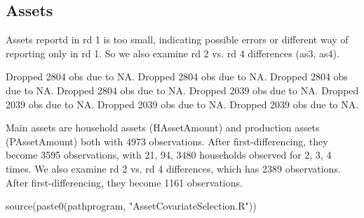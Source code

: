 \subsection{Assets}

Assets reportd in rd 1 is too small, indicating possible errors or different way of reporting only in rd 1. So we also examine rd 2 vs. rd 4 differences (\textsf{as3, as4}).


\begin{Schunk}
\begin{Soutput}
Dropped 2804 obs due to NA.
Dropped 2804 obs due to NA.
Dropped 2804 obs due to NA.
Dropped 2804 obs due to NA.
Dropped 2039 obs due to NA.
Dropped 2039 obs due to NA.
Dropped 2039 obs due to NA.
Dropped 2039 obs due to NA.
\end{Soutput}
\end{Schunk}

Main assets are household assets (\textsf{HAssetAmount}) and production assets (\textsf{PAssetAmount}) both with 4973 observations. After first-differencing, they become 3595 observations, with 21, 94, 3480 households observed for 2, 3, 4 times. We also examine rd 2 vs. rd 4 differences, which has 2389 observations. After first-differencing, they become 1161 observations.



\begin{Schunk}
\begin{Sinput}
source(paste0(pathprogram, "AssetCovariateSelection.R"))
\end{Sinput}
\end{Schunk}





